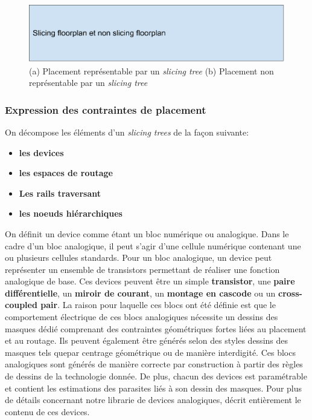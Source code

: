 \begin{figure}[h]
\begin{center}
\includegraphics[height=0.10\textheight]{Figures/10.pdf}
\caption{(a) Placement représentable par un \textit{slicing tree} (b) Placement non représentable par un \textit{slicing tree}}
\label{fig:10}
\end{center}
\end{figure} 
\subsubsection{Expression des contraintes de placement}
On décompose les éléments d'un \textit{slicing trees} de la façon suivante:
\begin{itemize}
\item \textbf{les devices}
\item \textbf{les espaces de routage}
\item \textbf{Les rails traversant}
\item \textbf{les noeuds hiérarchiques}
\end{itemize}

On définit un device comme étant un bloc numérique ou analogique. Dans le cadre d'un bloc analogique, il peut s'agir d'une cellule numérique contenant une ou plusieurs cellules standards. Pour un bloc analogique, un device peut représenter un ensemble de transistors permettant de réaliser une fonction analogique de base. Ces devices peuvent être un simple \textbf{transistor}, une \textbf{paire différentielle}, un \textbf{miroir de courant}, un \textbf{montage en cascode} ou un \textbf{cross-coupled pair}. La raison pour laquelle ces blocs ont été définie est que le comportement électrique de ces blocs analogiques nécessite un dessins des masques dédié comprenant des contraintes géométriques fortes liées au placement et au routage. Ils peuvent également être générés selon des styles dessins des masques tels quepar centrage géométrique ou de manière interdigité. Ces blocs analogiques sont générés de manière correcte par construction à partir des règles de dessins de la technologie donnée. De plus, chacun des devices est paramétrable et contient les estimations des parasites liés à son dessin des masques. Pour plus de détails concernant notre librarie de devices analogiques, \cite{youssef2012} décrit entièrement le contenu de ces devices. \newline

